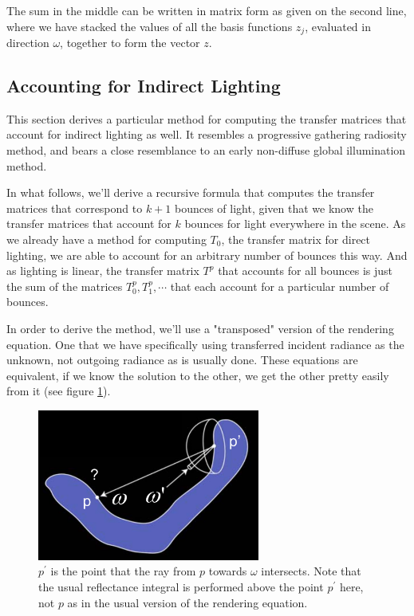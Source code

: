 The sum in the middle can be written in matrix form as given on the second line, where we have stacked the values of all the basis functions $z_j$, evaluated in direction $\omega$, together to form the vector $z$.




\subsection{Accounting for Indirect Lighting}
This section derives a particular method for computing the transfer matrices that account for indirect lighting as well. It resembles a progressive gathering radiosity method, and bears a close resemblance to an early non-diffuse global illumination method.

In what follows, we'll derive a recursive formula that computes the transfer matrices that correspond to $k+1$ bounces of light, given that we know the transfer matrices that account for $k$ bounces for light everywhere in the scene. As we already have a method for computing $T_0$, the transfer matrix for direct lighting, we are able to account for an arbitrary number of bounces this way. And as lighting is linear, the transfer matrix $T^{p}$ that accounts for all bounces is just the sum of the matrices $T^{p}_0,T^{p}_1,\cdots$ that each account for a particular number of bounces.

In order to derive the method, we'll use a "transposed" version of the rendering equation. One that we have specifically using transferred incident radiance as the unknown, not outgoing radiance as is usually done. These equations are equivalent, if we know the solution to the other, we get the other pretty easily from it (see figure \ref{f:prt-transposed-version}).

\begin{figure}
\sidecaption
	\includegraphics[width=0.65\textwidth]{graphics/prt/prt-12}
	\caption{$p^{'}$ is the point that the ray from $p$ towards $\omega$ intersects. Note that the usual reflectance integral is performed above the point $p^{'}$ here, not $p$ as in the usual version of the rendering equation.}
	\label{f:prt-transposed-version}
\end{figure}

